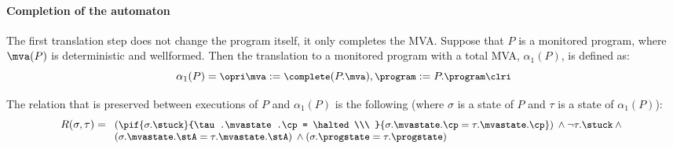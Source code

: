 


\paragraph{Completion of the automaton}
The first translation step does not change the program itself, it only
completes the MVA. Suppose that \(P\) is a monitored program, where
\(\mva(P)\) is deterministic and wellformed. Then the translation to a
monitored program with a total MVA, \(\alpha_1(P)\), is defined as:
\[{\small
\alpha_1(P) = \opri \mva := \complete(P.\mva), \program := P.\program
\clri
}
\]

The relation that is preserved between executions of \(P\) and
\(\alpha_1(P)\) is the following (where \(\sigma\) is a state of
\(P\) and \(\tau\) is a state of \(\alpha_1(P)\)):
\[{\small
R(\sigma, \tau) =\\
 \begin{array}[t]{l}
  (\pif {\sigma.\stuck}{\tau.\mvastate.\cp = \halted\\\ }
        {\sigma.\mvastate.\cp = \tau.\mvastate.\cp}) \:\wedge
  \neg \tau.\stuck \:\wedge\\
  (\sigma.\mvastate.\stA = \tau.\mvastate.\stA) \:\wedge
  (\sigma.\progstate = \tau.\progstate)
\end{array}}
\]

